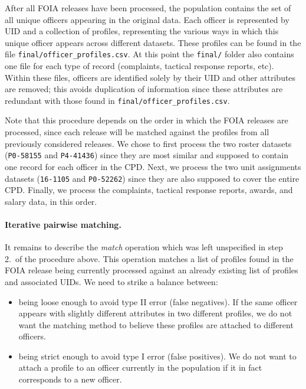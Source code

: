 After all FOIA releases have been processed, the population contains the set of
all unique officers appearing in the original data. Each officer is represented
by UID and a collection of profiles, representing the various ways in which
this unique officer appears across different datasets. These profiles can be
found in the file \texttt{final/officer\_profiles.csv}.
At this point the \texttt{final/} folder also contains
one file for each type of record (complaints, tactical response reports, etc).
Within these files, officers are identified solely by their UID and other attributes
are removed; this avoids duplication of
information since these attributes are redundant with those found in
\texttt{final/officer\_profiles.csv}.



Note that this procedure depends on the order in which the FOIA releases are processed,
since each release will be matched against the profiles from all
previously considered releases. We chose to first process the two roster datasets
(\texttt{P0-58155} and \texttt{P4-41436}) since they are most similar and
supposed to contain one record for each officer in the CPD. Next, we process
the two unit assignments datasets (\texttt{16-1105} and \texttt{P0-52262})
since they are also supposed to cover the entire CPD. Finally, we process the
complaints, tactical response reports, awards, and salary data, in this
order.

\paragraph{Iterative pairwise matching.}
It remains to describe the \emph{match} operation which was left unspecified in
step 2.\ of the procedure above. This operation
matches a list of profiles found in the FOIA release being currently processed
against an already existing list of profiles and associated UIDs. We need to strike a balance between:
\begin{itemize}
	\item being loose enough to avoid type II error (false negatives). If the
		same officer appears with slightly different attributes in two
		different profiles, we do not want the matching method to believe these
		profiles are attached to different officers.
	\item being strict enough to avoid type I error (false positives). We do
		not want to attach a profile to an officer currently in the population
		if it in fact corresponds to a new officer.
\end{itemize}

